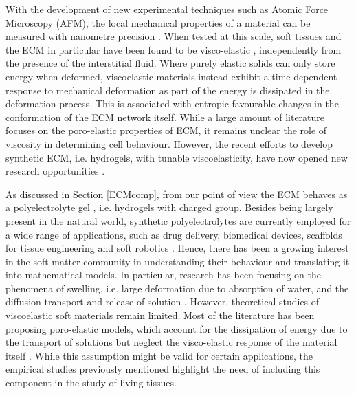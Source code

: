 With the development of new experimental techniques such as Atomic Force Microscopy (AFM), the local mechanical properties of a material can be measured with nanometre precision \cite{viscoporo}. When tested at this scale, soft tissues and the ECM in particular have been found to be visco-elastic \cite{ex5}, independently from the presence of the interstitial fluid. Where purely elastic solids can only store energy when deformed, viscoelastic materials instead exhibit a time-dependent response to mechanical deformation as part of the energy is dissipated in the deformation process. This is associated with entropic favourable changes in the conformation of the ECM network itself. While a large amount of literature focuses on the poro-elastic properties of ECM, it remains unclear the role of viscosity in determining cell behaviour. However, the recent efforts to develop synthetic ECM, i.e. hydrogels, with tunable viscoelasticity, have now opened new research opportunities \cite{viscocell}. 

As discussed in Section \ref{ECMcomp}, from our point of view the ECM behaves as a polyelectrolyte gel \cite{ecm1,ecm2}, i.e. hydrogels with charged group. Besides being largely present in the natural world, synthetic polyelectrolytes are currently employed for a wide range of applications, such as drug delivery, biomedical devices, scaffolds for tissue engineering and soft robotics \cite{hydroex3,hydroex2,hydroex1,hydroex4}. Hence, there has been a growing interest in the soft matter community in understanding their behaviour and translating it into mathematical models. In particular, research has been focusing on the phenomena of swelling, i.e. large deformation due to absorption of water, and the diffusion transport and release of solution \cite{DROZDOV+,DROZDOVph,Reviewpolyel,swell2}. However, theoretical studies of viscoelastic soft materials remain limited. Most of the literature has been proposing poro-elastic models, which account for the dissipation of energy due to the transport of solutions but neglect the visco-elastic response of the material itself \cite{Article1}. While this assumption might be valid for certain applications, the empirical studies previously mentioned highlight the need of including this component in the study of living tissues.

